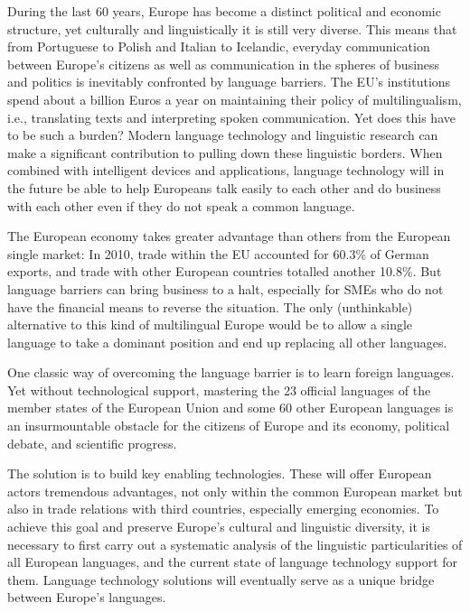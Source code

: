\begin{multicols}{2}
    
    During the last 60 years, Europe has become a distinct political and economic structure, yet culturally and linguistically it is still very diverse. This means that from Portuguese to Polish and Italian to Icelandic, everyday communication between Europe’s citizens as well as communication in the spheres of business and politics is inevitably confronted by language barriers. The EU’s institutions spend about a billion Euros a year on maintaining their policy of multilingualism, i.e., translating texts and interpreting spoken communication. Yet does this have to be such a burden? Modern language technology and linguistic research can make a significant contribution to pulling down these linguistic borders. When combined with intelligent devices and applications, language technology will in the future be able to help Europeans talk easily to each other and do business with each other even if they do not speak a common language. 


    The European economy takes greater advantage than others from the European single market: In 2010, trade within the EU accounted for 60.3\% of German exports, and trade with other European countries totalled another 10.8\%. But language barriers can bring business to a halt, especially for SMEs who do not have the financial means to reverse the situation. The only (unthinkable) alternative to this kind of multilingual Europe would be to allow a single language to take a dominant position and end up replacing all other languages. 

    One classic way of overcoming the language barrier is to learn foreign languages. Yet without technological support, mastering the 23 official languages of the member states of the European Union and some 60 other European languages is an insurmountable obstacle for the citizens of Europe and its economy, political debate, and scientific progress. 

    The solution is to build key enabling technologies. These will offer European actors tremendous advantages, not only within the common European market but also in trade relations with third countries, especially emerging economies. To achieve this goal and preserve Europe’s cultural and linguistic diversity, it is necessary to first carry out a systematic analysis of the linguistic particularities of all European languages, and the current state of language technology support for them. Language technology solutions will eventually serve as a unique bridge between Europe’s languages. 


\end{multicols}
